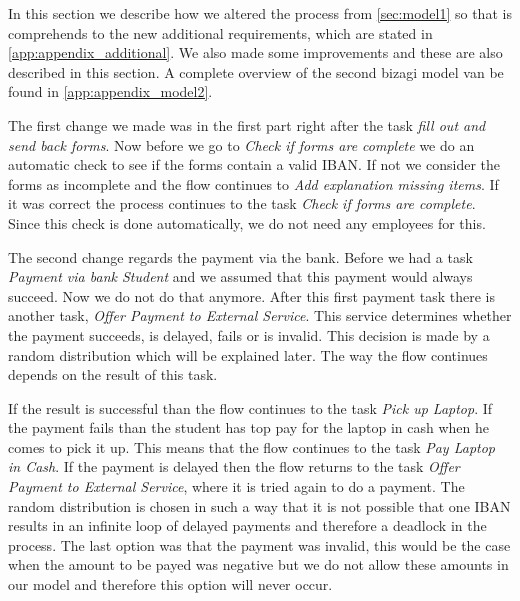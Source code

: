 
In this section we describe how we altered the process from \autoref{sec:model1} so that is comprehends to the new additional requirements, which are stated in \autoref{app:appendix_additional}.
We also made some improvements and these are also described in this section.
A complete overview of the second bizagi model van be found in \autoref{app:appendix_model2}.

The first change we made was in the first part right after the task \emph{fill out and send back forms}.
Now before we go to \emph{Check if forms are complete} we do an automatic check to see if the forms contain a valid IBAN.
If not we consider the forms as incomplete and the flow continues to \emph{Add explanation missing items}.
If it was correct the process continues to the task \emph{Check if forms are complete}. Since this check is done automatically, we do not need any employees for this.

The second change regards the payment via the bank. Before we had a task \emph{Payment via bank Student} and we assumed that this payment would always succeed.
Now we do not do that anymore. After this first payment task there is another task, \emph{Offer Payment to External Service}.
This service determines whether the payment succeeds, is delayed, fails or is invalid.
This decision is made by a random distribution which will be explained later.
The way the flow continues depends on the result of this task.

If the result is successful than the flow continues to the task \emph{Pick up Laptop}.
If the payment fails than the student has top pay for the laptop in cash when he comes to pick it up.
This means that the flow continues to the task \emph{Pay Laptop in Cash}.
If the payment is delayed then the flow returns to the task \emph{Offer Payment to External Service}, where it is tried again to do a payment.
The random distribution is chosen in such a way that it is not possible that one IBAN results in an infinite loop of delayed payments and therefore a deadlock in the process.
The last option was that the payment was invalid, this would be the case when the amount to be payed was negative but we do not allow these amounts in our model and therefore this option will never occur.

